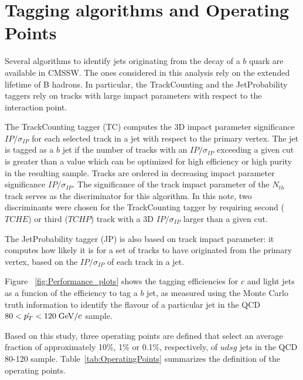 \section{Tagging algorithms and Operating Points}
\label{sec:taggingalgos}
Several algorithms to identify jets originating from 
the decay of a $b$ quark are available in CMSSW. The ones considered in this 
analysis rely on the extended lifetime of B hadrons. In particular, the 
TrackCounting and the JetProbability taggers rely on tracks with large impact 
parameters with respect to the interaction point. 

The TrackCounting tagger (TC) computes the 3D impact parameter significance 
$IP/\sigma_{IP}$ for each selected track in a jet with respect to
the primary vertex. The jet is tagged as a 
$b$ jet if the number of tracks with an $IP/\sigma_{IP}$ exceeding a given 
cut is greater than a value which can be optimized for high efficiency or
high purity in the resulting sample. Tracks are ordered in decreasing 
impact parameter significance $IP/\sigma_{IP}$. The significance of the track
impact parameter of the $N_{th} $ track serves as the discriminator for this 
algorithm.
In this note, two discriminants were chosen for the TrackCounting tagger by 
requiring second ($TCHE$) or third ($TCHP$) track with a 3D $IP/\sigma_{IP}$ 
larger than a given cut.

The JetProbability tagger (JP) is also based on track impact parameter:
it computes how likely it is for a set of tracks to have originated from the 
primary vertex, based on the $IP/\sigma_{IP}$ of each track in a jet. 

Figure ~\ref{fig:Performance_plots} shows the tagging efficiencies for $c$ and 
light jets as a funcion of the efficiency to tag a $b$ jet, as measured  
using the Monte Carlo truth information to identify the flavour of a 
particular jet in the QCD $80<\hat{p_T}<120\;{\rm GeV}/c$ sample. 

Based on this study, three operating points are defined that select 
an average fraction of approximately 10\%, 1\% or 0.1\%, 
respectively, of $udsg$ jets in the QCD 80-120 sample.
Table~\ref{tab:OperatingPoints} summarizes 
the definition of the operating points.

